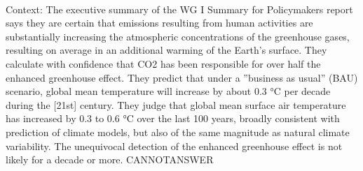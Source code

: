 \documentclass[11pt,a4paper, onecolumn]{article}
\begin{document}
\\ Context: The executive summary of the WG I Summary for Policymakers report says they are certain that emissions resulting from human activities are substantially increasing the atmospheric concentrations of the greenhouse gases, resulting on average in an additional warming of the Earth's surface. They calculate with confidence that CO2 has been responsible for over half the enhanced greenhouse effect. They predict that under a ''business as usual'' (BAU) scenario, global mean temperature will increase by about 0.3 °C per decade during the [21st] century. They judge that global mean surface air temperature has increased by 0.3 to 0.6 °C over the last 100 years, broadly consistent with prediction of climate models, but also of the same magnitude as natural climate variability. The unequivocal detection of the enhanced greenhouse effect is not likely for a decade or more. CANNOTANSWER
\end{document}

